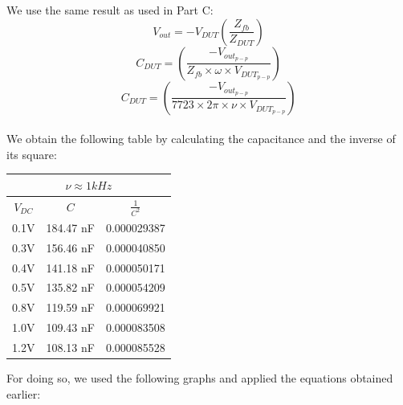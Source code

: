 \documentclass[12pt]{article}
\begin{document}
We use the same result as used in Part C:
\[ V_{out} = -V_{DUT}\left( \frac{Z_{fb}}{Z_{DUT}} \right) \] \[ C_{DUT} = \left( \frac{- V_{out_{p-p}}}{Z_{fb} \times \omega \times V_{DUT_{p-p}}} \right) \] \[ C_{DUT} = \left(  \frac{-V_{out_{p-p}}}{7723 \times 2 \pi \times \nu \times V_{DUT_{p-p}}} \right) \] \\
We obtain the following table by calculating the capacitance and the inverse of its square:
\begin{center}
 \begin{tabular}{||c | c | c ||} 
 \hline 
 \multicolumn{3}{||c||}{\( \nu \approx 1kHz \)} \\
 \hline
 \( V_{DC} \) & \( C \) & \( \frac{1}{C^2} \) \\
 \hline\hline
 0.1V & 184.47 nF & 0.000029387 \\
 0.3V & 156.46 nF & 0.000040850 \\
 0.4V & 141.18 nF & 0.000050171 \\
 0.5V & 135.82 nF & 0.000054209 \\
 0.8V & 119.59 nF & 0.000069921 \\
 1.0V & 109.43 nF & 0.000083508 \\
 1.2V & 108.13 nF & 0.000085528 \\
 \hline
\end{tabular}
\end{center}
For doing so, we used the following graphs and applied the equations obtained earlier:
\end{document}
